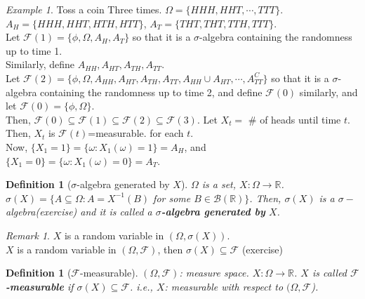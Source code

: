 \documentclass[12pt]{report}
\renewcommand{\1}{\mathbb{1}}
\renewcommand{\subset}{\subseteq}
\theoremstyle{break}
\theoremstyle{newdef}
\newtheorem{defn}[thm]{Definition} %
\theoremstyle{remark}
\newtheorem*{exmp}{Example} %
\newtheorem*{rem}{Remark} %
\begin{document}
\begin{exmp}
Toss a coin Three times.
$\Omega = \{ HHH, HHT, \cdots, TTT\}$.\\
$A_H = \{ HHH, HHT, HTH, HTT\}$,
$A_T = \{ THT, THT, TTH, TTT\}$.\\
Let $\mathcal{F}(1) = \{ \phi, \Omega, A_H, A_T\}$ so that
it is a $\sigma$-algebra containing the randomness up to time 1.\\
Similarly, define $A_{HH}, A_{HT}, A_{TH}, A_{TT}$.\\
Let $\mathcal{F}(2) = \{ \phi, \Omega, A_{HH}, A_{HT}, A_{TH}, A_{TT}, A_{HH} \cup A_{HT}, \cdots, A_{TT}^C\}$
so that it is a $\sigma$-algebra containing the randomness up to time 2, and define $\mathcal{F}(0)$ similarly, and let $\mathcal{F}(0) = \{ \phi, \Omega\}$.\\
Then, $\mathcal{F}(0) \subset \mathcal{F}(1) \subset \mathcal{F}(2) \subset \mathcal{F}(3)$.
Let $X_t =$ \# of heads until time $t$.
Then, $X_t$ is $\mathcal{F}(t)$=measurable. for each $t$.\\
Now, $\{ X_1 = 1\} = \{ \omega: X_1(\omega) = 1 \} = A_H$, and $\{X_1 = 0\} = \{ \omega : X_1(\omega) = 0\} = A_T$.
\end{exmp}






\begin{defn}[$\sigma$-algebra generated by $X$]
$\Omega$ is a set, $X : \Omega \rightarrow \mathbb{R}$.
$\sigma(X) = \{ A \subset \Omega : A = X^{-1}(B)$ for some $B \in \mathcal{B}(\mathbb{R})\}$.
Then, $\sigma(X)$ is a $\sigma-$algebra(exercise) and it is called a \textbf{$\sigma$-algebra generated by} $X$.
\end{defn}

\begin{rem}
$X$ is a random variable in $(\Omega, \sigma(X))$.\\
$X$ is a random variable in $(\Omega, \mathcal{F})$, then $\sigma(X) \subset \mathcal{F}$ (exercise)
\end{rem}


\begin{defn}[$\mathcal{F}$-measurable]
$(\Omega, \mathcal{F})$: measure space.
$X : \Omega \rightarrow \mathbb{R}$.
$X$ is called \textbf{$\mathcal{F}$-measurable} if $\sigma(X) \subset \mathcal{F}$.
i.e., $X$: measurable with respect to $(\Omega, \mathcal{F}$).
\end{defn}
\end{document}
